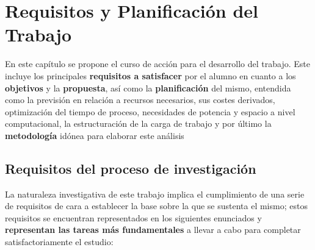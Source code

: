 \chapter{Requisitos y Planificación del Trabajo}

En este capítulo se propone el curso de acción para el desarrollo del trabajo. Este incluye los principales \textbf{requisitos a satisfacer} por el alumno en cuanto a los \textbf{objetivos} y la \textbf{propuesta}, así como la \textbf{planificación} del mismo, entendida como la previsión en relación a recursos necesarios, sus costes derivados, optimización del tiempo de proceso, necesidades de potencia y espacio a nivel computacional, la estructuración de la carga de trabajo y por último la \textbf{metodología} idónea para elaborar este análisis

\section{Requisitos del proceso de investigación}

La naturaleza investigativa de este trabajo implica el cumplimiento de una serie de requisitos de cara a establecer la base sobre la que se sustenta el mismo; estos requisitos se encuentran representados en los siguientes enunciados y \textbf{representan las tareas más fundamentales }a llevar a cabo para completar satisfactoriamente el estudio:

